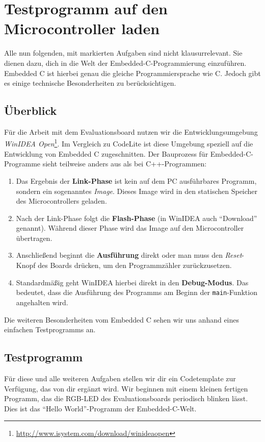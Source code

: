 \section{\ExercisePrefixEmbeddedC Testprogramm auf den Microcontroller laden \optional}

Alle nun folgenden, mit \ExercisePrefixEmbeddedC markierten Aufgaben sind nicht klausurrelevant.
Sie dienen dazu, dich in die Welt der Embedded-C-Programmierung einzuführen.
Embedded C ist hierbei genau die gleiche Programmiersprache wie C.
Jedoch gibt es einige technische Besonderheiten zu berücksichtigen.

\subsection{Überblick}
Für die Arbeit mit dem Evaluationsboard nutzen wir die Entwicklungsumgebung \emph{WinIDEA Open}\footnote{\url{http://www.isystem.com/download/winideaopen}}.
%
Im Vergleich zu CodeLite ist diese Umgebung speziell auf die Entwicklung von Embedded C zugeschnitten.
Der Bauprozess für Embedded-C-Programme sieht teilweise anders aus als bei C++-Programmen:
\begin{enumerate}
\item 
Das Ergebnis der \textbf{Link-Phase} ist kein auf dem PC ausführbares Programm, sondern ein sogenanntes \emph{Image}.
Dieses Image wird in den statischen Speicher des Microcontrollers geladen.
\item
Nach der Link-Phase folgt die \textbf{Flash-Phase} (in WinIDEA auch \enquote{Download} genannt).
Während dieser Phase wird das Image auf den Microcontroller übertragen.
\item 
Anschließend beginnt die \textbf{Ausführung} direkt oder man muss den \emph{Reset}-Knopf des Boards drücken, um den Programmzähler zurückzusetzen.
\item
Standardmäßig geht WinIDEA hierbei direkt in den \textbf{Debug-Modus}.
Das bedeutet, dass die Ausführung des Programms am Beginn der \lstinline|main|-Funktion angehalten wird.
\end{enumerate}

Die weiteren Besonderheiten vom Embedded C sehen wir uns anhand eines einfachen Testprogramms an.

\subsection{Testprogramm}
Für diese und alle weiteren Aufgaben stellen wir dir ein Codetemplate zur Verfügung, das von dir ergänzt wird.
Wir beginnen mit einem kleinen fertigen Programm, das die RGB-LED des Evaluationsboards periodisch blinken lässt.
Dies ist das \enquote{Hello World}-Programm der Embedded-C-Welt.

